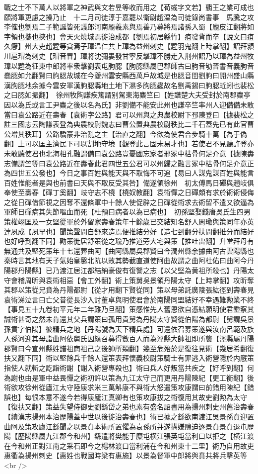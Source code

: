 戰之士不下萬人以將軍之神武與文若昱等收而用之【荀彧字文若】覇王之業可成也願將軍更慮之操乃止　十二月司徒淳于嘉罷以衛尉趙温為司徒錄尚書事　馬騰之攻李傕也劉焉二子範誕皆死議郎河南龎羲素與焉善乃募將焉諸孫入蜀【龐皮江翻將如字領也攜也挾也】會天火燒城焉徙治成都【劉焉初居緜竹】疽發背而卒【說文曰疽久癰】州大吏趙韙等貪焉子璋温仁共上璋為益州刺史【韙羽鬼翻上時掌翻】詔拜潁川扈瑁為刺史【瑁音冒】璋將沈彌婁發甘寧反擊璋不勝走入荆州詔乃以璋為益州牧璋以韙為征東中郎將率衆擊劉表屯朐䏰【胊䏰縣屬巴郡師古曰朐音劬晉書音義朐音蠢䏰如允翻賢曰朐䏰故城在今夔州雲安縣西萬戶故城是也䏰音閏劉朐曰開州盛山縣漢胊䏰地余據今雲安軍漢朐䏰縣地土地下濕多朐䏰蟲故名劉禹錫曰朐䏰蚯蚓也裴松之曰䏰如振翻】　徐州牧陶謙疾篤謂别駕東海麋竺曰【姓譜楚大夫受封於南郡麋亭因以為氏或言工尹麋之後以名為氏】非劉備不能安此州也謙卒竺率州人迎備備未敢當曰袁公路近在壽春【袁術字公路】君可以州與之典農校尉下邳陳登曰【據裴松之註三國志云陶謙表登為典農校尉魏志曰曹公置典農校尉秩比二千石蓋先已有此官曹公增其秩耳】公路驕豪非治亂之主【治直之翻】今欲為使君合步騎十萬【為于偽翻】上可以匡主濟民下可以割地守境【觀登此言固未易才也】若使君不見聽許登亦未敢聽使君也北海相孔融謂備曰袁公路豈憂國忘家者邪冢中枯骨何足介意【據陳夀志備謂竺等曰袁公路近在夀春此君四世五公君可以州歸之融言冢中枯骨何足介意正為四世五公發也】今日之事百姓與能天與不取悔不可追【易曰人謀鬼謀百姓與能言百姓惟能者是與也前書曰天與不取反受其咎】備遂領徐州　初太傅馬日磾與趙岐俱奉使至壽春【磾丁奚翻】岐守志不橈【橈奴教翻】袁術憚之日磾頗有求於術術侵侮之從日磾借節視之因奪不還條軍中十餘人使促辟之日磾從術求去術留不遣又欲逼為軍師日磾病其失節嘔血而死【杜預曰病者以為已病也】　初孫堅娶錢唐吳氏生四男策權翊匡及一女堅從軍於外留家壽春策年十餘歲已交結知名舒人周瑜與策同年亦英逹夙成【夙早也】聞策聲問自舒來造焉便推結分好【造七到翻分扶問翻推分而結好也好呼到翻下同】勸策徙居舒策從之瑜乃推道旁大宅與策【推吐雷翻】升堂拜母有無通共及堅死策年十七還葬曲阿【曲阿縣屬吳郡賢曰今潤州縣余據曲阿古雲陽縣也秦時言其地有天子氣始皇鑿北阬以敗其勢截直道使阿曲故謂之曲阿杜佑曰曲阿今丹陽郡丹陽縣】已乃渡江居江都結納豪俊有復讐之志【以父堅為黄祖所殺也】丹陽太守會稽周昕與袁術相惡【會工外翻】術上策舅吳景領丹陽太守【上時掌翻】攻昕奪其郡以策從兄賁為丹陽都尉【從才用翻下賢從同】策以母弟託廣陵張紘徑到壽春見袁術涕泣言曰亡父昔從長沙入討董卓與明使君會於南陽同盟結好不幸遇難勲業不終【事見五十九卷初平元年二年難乃旦翻】策感惟先人舊恩欲自憑結願明使君埀察其誠術甚奇之然未肯還其父兵謂策曰孤用貴舅為丹陽太守賢從伯陽為都尉【舅謂吳景孫賁字伯陽】彼精兵之地【丹陽號為天下精兵處】可還依召募策遂與汝南呂範及族人孫河迎其母詣曲阿依舅氏因緣召募得數百人而為涇縣大帥祖即所襲【涇縣屬丹陽郡賢曰今宣州縣姓譜祖商祖己之後帥所類翻】幾至危殆於是復往見術【幾居希翻復扶又翻下同】術以堅餘兵千餘人還策表拜懷義校尉策騎士有罪逃入術營隱於内廐策指使人就斬之訖詣術謝【謝入術營專殺也】術曰兵人好叛當共疾之【好呼到翻】何為謝也由是軍中益畏憚之術初許以策為九江太守己而更用丹陽陳紀【更工衡翻】後術欲攻徐州從廬江太守陸康求米三萬斛康不與術大怒遣策攻康謂曰前錯用陳紀【錯誤也】每恨本意不遂今若得康廬江真卿有也策攻康拔之術復用其故吏劉勲為太守【復扶又翻】策益失望侍御史劉繇岱之弟也素有盛名詔書用為揚州刺史州舊治壽春【續漢志揚州本治歷陽蓋中世以後徙治壽春也】術已據之繇欲南渡江吳景孫賁迎置曲阿及策攻廬江繇聞之以景賁本術所置懼為袁孫所并遂搆嫌隙迫逐景賁景賁退屯歷陽【歷陽縣屬九江郡今和州】繇遣將樊能于糜屯横江張英屯當利口以拒之【横江渡在今和州正對江南之采石即今之楊林渡口當利浦在今和州東十二里】術乃自用故吏惠衢為揚州刺史【惠姓也戰國時梁有惠施】以景為督軍中郎將與賁共將兵擊英等<br />
